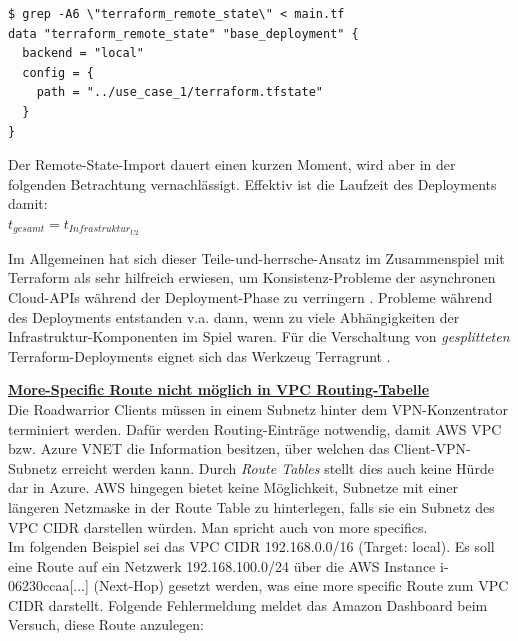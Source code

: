 \begin{lstlisting}[label=tf-remote-state-import,caption=.]
$ grep -A6 \"terraform_remote_state\" < main.tf
data "terraform_remote_state" "base_deployment" {
  backend = "local"
  config = {
    path = "../use_case_1/terraform.tfstate"
  }
}
\end{lstlisting}

Der Remote-State-Import dauert einen kurzen Moment, wird aber in der folgenden Betrachtung vernachlässigt.
Effektiv ist die Laufzeit des Deployments damit:\\
$t_{gesamt} = t_{Infrastruktur_{U2}}$

Im Allgemeinen hat sich dieser \glqq Teile-und-herrsche\grqq{}-Ansatz im Zusammenspiel mit Terraform als sehr hilfreich erwiesen, um Konsistenz-Probleme der asynchronen Cloud-APIs während der Deployment-Phase zu verringern \cite[S.183-184]{Brikman2019}. Probleme während des Deployments entstanden v.a. dann, wenn \glqq zu viele\grqq{} Abhängigkeiten der Infrastruktur-Komponenten im Spiel waren. Für die Verschaltung von \textit{gesplitteten} Terraform-Deployments eignet sich das Werkzeug Terragrunt \cite[S.98]{Brikman2019}.

\textbf{\underline{More-Specific Route nicht möglich in VPC Routing-Tabelle}}\\
Die Roadwarrior Clients müssen in einem Subnetz \glqq hinter\grqq{} dem VPN-Konzentrator terminiert werden. Dafür werden Routing-Einträge notwendig, damit AWS VPC bzw. Azure VNET die Information besitzen, über welchen  das Client-VPN-Subnetz erreicht werden kann. Durch \textit{Route Tables} stellt dies auch keine Hürde dar in Azure. AWS hingegen bietet keine Möglichkeit, Subnetze mit einer längeren Netzmaske in der Route Table zu hinterlegen, falls sie ein Subnetz des VPC CIDR darstellen würden. Man spricht auch von \glqq more specifics\grqq{}.\\
Im folgenden Beispiel sei das VPC CIDR 192.168.0.0/16 (Target: local). Es soll eine Route auf ein Netzwerk 192.168.100.0/24 über die AWS Instance \glqq i-06230ccaa[...]\grqq{} (Next-Hop) gesetzt werden, was eine more specific Route zum VPC CIDR darstellt.
Folgende Fehlermeldung meldet das Amazon Dashboard beim Versuch, diese Route anzulegen:

